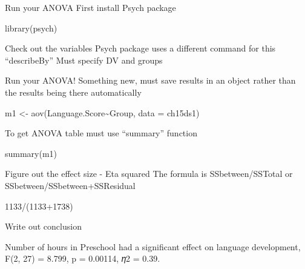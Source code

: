 \documentclass[
]{book}
\newenvironment{Shaded}{\begin{snugshade}}{\end{snugshade}}
\newcommand{\AttributeTok}[1]{\textcolor[rgb]{0.77,0.63,0.00}{#1}}
\newcommand{\DecValTok}[1]{\textcolor[rgb]{0.00,0.00,0.81}{#1}}
\newcommand{\FunctionTok}[1]{\textcolor[rgb]{0.00,0.00,0.00}{#1}}
\newcommand{\NormalTok}[1]{#1}
\newcommand{\OtherTok}[1]{\textcolor[rgb]{0.56,0.35,0.01}{#1}}
\newcommand{\SpecialCharTok}[1]{\textcolor[rgb]{0.00,0.00,0.00}{#1}}
\begin{document}
Run your ANOVA
First install Psych package

\begin{Shaded}
\begin{Highlighting}[]
\FunctionTok{library}\NormalTok{(psych)}
\end{Highlighting}
\end{Shaded}

Check out the variables
Psych package uses a different command for this ``describeBy''
Must specify DV and groups

\begin{Shaded}
\end{Shaded}

Run your ANOVA!
Something new, must save results in an object rather than the results being there automatically

\begin{Shaded}
\begin{Highlighting}[]
\NormalTok{m1 }\OtherTok{\textless{}{-}} \FunctionTok{aov}\NormalTok{(Language.Score}\SpecialCharTok{\textasciitilde{}}\NormalTok{Group, }\AttributeTok{data =}\NormalTok{ ch15ds1)}
\end{Highlighting}
\end{Shaded}

To get ANOVA table must use ``summary'' function

\begin{Shaded}
\begin{Highlighting}[]
\FunctionTok{summary}\NormalTok{(m1)}
\end{Highlighting}
\end{Shaded}

Figure out the effect size - Eta squared
The formula is SSbetween/SSTotal or SSbetween/SSbetween+SSResidual

\begin{Shaded}
\begin{Highlighting}[]
\DecValTok{1133}\SpecialCharTok{/}\NormalTok{(}\DecValTok{1133}\SpecialCharTok{+}\DecValTok{1738}\NormalTok{)}
\end{Highlighting}
\end{Shaded}

Write out conclusion

Number of hours in Preschool had a significant effect on language development, F(2, 27) = 8.799, p = 0.00114, 𝜂2 = 0.39.
\end{document}
